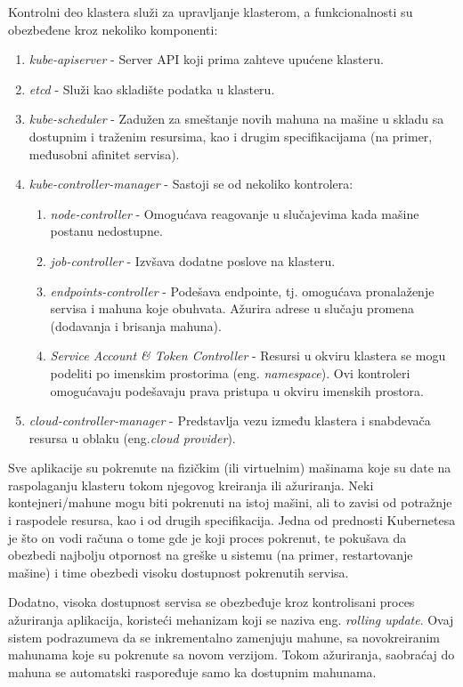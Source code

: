 \documentclass[12pt,oneside]{memoir}
\begin{document}
Kontrolni deo klastera služi za upravljanje klasterom, a funkcionalnosti su obezbeđene kroz nekoliko komponenti:
\begin{enumerate}
\item \emph{kube-apiserver} - Server API koji prima zahteve upućene klasteru.
\item \emph{etcd} - Služi kao skladište podatka u klasteru.
\item \emph{kube-scheduler} - Zadužen za smeštanje novih mahuna na mašine u skladu sa dostupnim i traženim resursima, kao i drugim specifikacijama (na primer, međusobni afinitet servisa).
\item \emph{kube-controller-manager} - Sastoji se od nekoliko kontrolera:
	\begin{enumerate}
	\item \emph{node-controller} - Omogućava reagovanje u slučajevima kada mašine postanu nedostupne.
	\item \emph{job-controller} - Izvšava dodatne poslove na klasteru.
	\item \emph{endpoints-controller} - Podešava endpointe, tj. omogućava pronalaženje servisa i mahuna koje obuhvata. Ažurira adrese u slučaju promena (dodavanja i brisanja mahuna).
	\item \emph{Service Account \& Token Controller} - Resursi u okviru klastera se mogu podeliti po imenskim prostorima (eng. \emph{namespace}). Ovi kontroleri omogućavaju podešavaju prava pristupa u okviru imenskih prostora.
	\end{enumerate}
\item \emph{cloud-controller-manager} - Predstavlja vezu između klastera i snabdevača resursa u oblaku (eng.\emph{cloud provider}).
\end{enumerate}
Sve aplikacije su pokrenute na fizičkim (ili virtuelnim) mašinama koje su date na raspolaganju klasteru tokom njegovog kreiranja ili ažuriranja. Neki kontejneri/mahune mogu biti pokrenuti na istoj mašini, ali to zavisi od potražnje i raspodele resursa, kao i od drugih specifikacija. Jedna od prednosti Kubernetesa je što on vodi računa o tome gde je koji proces pokrenut, te pokušava da obezbedi najbolju otpornost na greške u sistemu (na primer, restartovanje mašine) i time obezbedi visoku dostupnost pokrenutih servisa.

Dodatno, visoka dostupnost servisa se obezbeđuje kroz kontrolisani proces ažuriranja aplikacija, koristeći mehanizam koji se naziva eng. \emph{rolling update}. Ovaj sistem podrazumeva da se inkrementalno zamenjuju mahune, sa novokreiranim mahunama koje su pokrenute sa novom verzijom. Tokom ažuriranja, saobraćaj do mahuna se automatski raspoređuje samo ka dostupnim mahunama.
\end{document}
